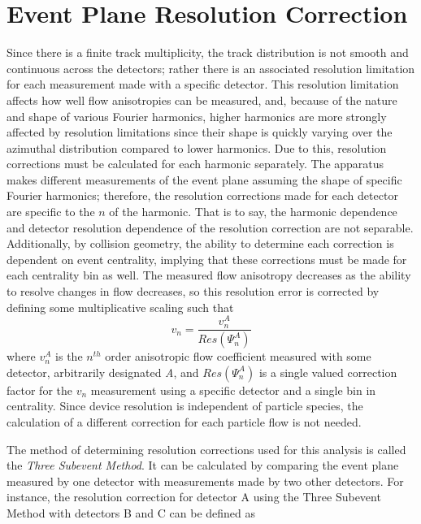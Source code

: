 \section{Event Plane Resolution Correction}
\label{sect:epres}
Since there is a finite track multiplicity, the track distribution is not smooth and continuous across the detectors; rather there is an associated resolution limitation for each measurement made with a specific detector. This resolution limitation affects how well flow anisotropies can be measured, and, because of the nature and shape of various Fourier harmonics, higher harmonics are more strongly affected by resolution limitations since their shape is quickly varying over the azimuthal distribution compared to lower harmonics. Due to this, resolution corrections must be calculated for each harmonic separately. The apparatus makes different measurements of the event plane assuming the shape of specific Fourier harmonics; therefore, the resolution corrections made for each detector are specific to the $n$ of the harmonic. That is to say, the harmonic dependence and detector resolution dependence of the resolution correction are not separable. Additionally, by collision geometry, the ability to determine each correction is dependent on event centrality, implying that these corrections must be made for each centrality bin as well. The measured flow anisotropy decreases as the ability to resolve changes in flow decreases, so this resolution error is corrected by defining some multiplicative scaling such that
\begin{equation}
v_n = \frac{v_n^{A}}{Res(\Psi_n^A)}
\end{equation}
where $v_n^{A}$ is the $n^{th}$ order anisotropic flow coefficient measured with some detector, arbitrarily designated \textit{A}, and $Res(\Psi_n^A)$ is a single valued correction factor for the $v_n$ measurement using a specific detector and a single bin in centrality. Since device resolution is independent of particle species, the calculation of a different correction for each particle flow is not needed. 

The method of determining resolution corrections used for this analysis is called the \textit{Three Subevent Method}. It can be calculated by comparing the event plane measured by one detector with measurements made by two other detectors. For instance, the resolution correction for detector A using the Three Subevent Method with detectors B and C can be defined as \citep{PhysRevC.58.1671}

